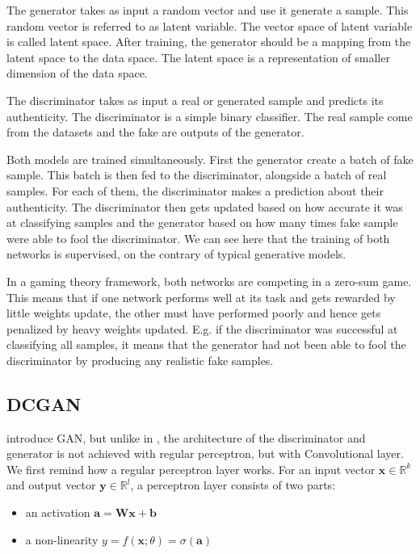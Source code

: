 \documentclass[11pt,a4paper,twoside]{report}
\begin{document}
The generator takes as input a random vector and use it generate a sample. This random vector is referred to as latent variable. The vector space of latent variable is called latent space. After training, the generator should be a mapping from the latent space to the data space. The latent space is  a representation of smaller dimension of the data space.

The discriminator takes as input a real or generated sample and predicts its authenticity. The discriminator is a simple binary classifier. The real sample come from the datasets and the fake are outputs of the generator.

Both models are trained simultaneously. First the generator create a batch of fake sample. This batch is then fed to the discriminator, alongside a batch of real samples. For each of them, the discriminator makes a prediction about their authenticity. The discriminator then gets updated based on how accurate it was at classifying samples and the generator based on how many times fake sample were able to fool the discriminator. We can see here that the training of both networks is supervised, on the contrary of typical generative models.

In a gaming theory framework, both networks are competing in a zero-sum game. This means that if one network performs well at its task and gets rewarded by little weights update, the other must have performed poorly and hence gets penalized by heavy weights updated. E.g. if the discriminator was successful at classifying all samples, it means that the generator had not been able to fool the discriminator by producing any realistic fake samples.  


\subsection{DCGAN}

\cite{radford2015unsupervised} introduce GAN, but unlike in \cite{goodfellow2020generative}, the architecture of the discriminator and generator is not achieved with regular perceptron, but with Convolutional layer. We first remind how a regular perceptron layer works. For an input vector $\mathbf{x} \in \mathbb{R}^k$ and output vector $\mathbf{y} \in \mathbb{R}^l$, a perceptron layer consists of two parts:

\begin{itemize}
    \item an activation $\mathbf{a} = \mathbf{W} \mathbf{x} + \mathbf{b}$
    \item a non-linearity $y = f(\mathbf{x};\theta) = \sigma(\mathbf{a})$
\end{itemize}
\end{document}
